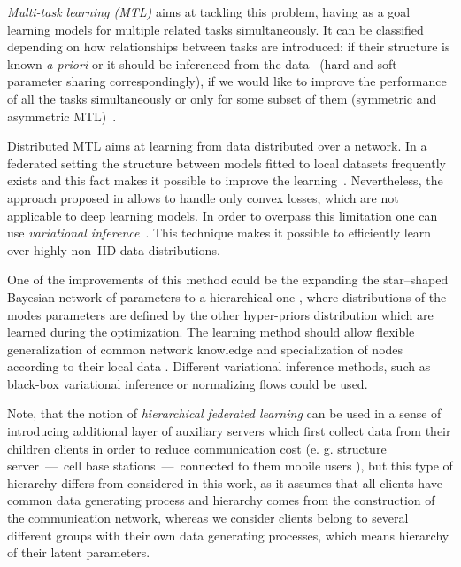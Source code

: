 \documentclass{article}
\begin{document}
\textit{Multi-task learning (MTL)} aims at tackling this problem, having as a goal learning models for multiple related tasks simultaneously. It can be classified depending on how relationships between tasks are introduced: if their structure is known \textit{a priori} or it should be inferenced from the data~\cite{smith2017federated} (hard and soft parameter sharing correspondingly), if we would like to improve the performance of all the tasks simultaneously or only for some subset of them (symmetric and asymmetric MTL)~\cite{Zhang2010}.

Distributed MTL aims at learning from data distributed over a network. In a federated setting the structure between models fitted to local datasets frequently exists and this fact makes it possible to improve the learning~\cite{smith2017federated, Goncalves}. Nevertheless, the approach proposed in \cite{smith2017federated} allows to handle only convex losses, which are not applicable to deep learning models. In order to overpass this limitation one can use \textit{variational inference}~\cite{corinzia2019variational}. This technique makes it possible to efficiently learn over highly non--IID data distributions.

One of the improvements of this method could be the expanding the star--shaped Bayesian network of parameters to a hierarchical one \cite{ranganath2015hierarchical}, where distributions of the modes parameters are defined by the other hyper-priors distribution which are learned during the optimization. The learning method should allow flexible generalization of common network knowledge and specialization of nodes according to their local data \cite{nguyen2020distributed}. Different variational inference methods, such as black-box variational inference \cite{ranganath2013black} or normalizing flows \cite{rezende2015variational} could be used.

Note, that the notion of \textit{hierarchical federated learning} can be used in a sense of introducing additional layer of auxiliary servers which first collect data from their children clients in order to reduce communication cost (e. g. structure server~---~cell base stations~---~connected to them mobile users \cite{Liu2019, Abad2020}), but this type of hierarchy differs from considered in this work, as it assumes that all clients have common data generating process and hierarchy comes from the construction of the communication network, whereas we consider clients belong to several different groups with their own data generating processes, which means hierarchy of their latent parameters.
\end{document}
